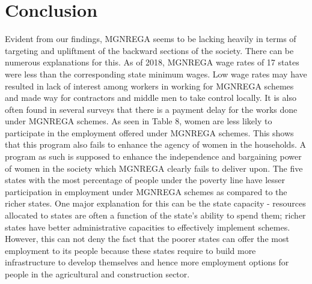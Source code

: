 \documentclass{article}
\begin{document}
\newpage
\section{Conclusion}
\label{conclusion}
Evident from our findings, MGNREGA seems to be lacking heavily in terms of targeting and upliftment of the backward sections of the society. There can be numerous explanations for this. As of 2018, MGNREGA wage rates of 17 states were less than the corresponding state minimum wages. Low wage rates may have resulted in lack of interest among workers in working for MGNREGA schemes and made way for contractors and middle men to take control locally. It is also often found in several surveys that there is a payment delay for the works done under MGNREGA schemes. As seen in Table 8, women are less likely to participate in the employment offered under MGNREGA schemes. This shows that this program also fails to enhance the agency of women in the households. A program as such is supposed to enhance the independence and bargaining power of women in the society which MGNREGA clearly fails to deliver upon. The five states with the most percentage of people under the poverty line have lesser participation in employment under MGNREGA schemes as compared to the richer states. One major explanation for this can be the state capacity - resources allocated to states are often a function of the state's ability to spend them; richer states have better administrative capacities to effectively implement schemes. However, this can not deny the fact that the poorer states can offer the most employment to its people because these states require to build  more infrastructure to develop themselves and hence more employment options for people in the agricultural and construction sector. 

\newpage 
\end{document}
